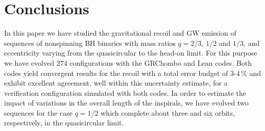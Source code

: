 \section{Conclusions}
\label{bhkick:sec:concl}
%
In this paper we have studied the gravitational recoil and GW emission
of sequences of nonspinning BH binaries with mass ratios $q=2/3$,
$1/2$ and $1/3$,
and eccentricity varying from the quasicircular to the head-on limit.
For this purpose we have evolved $274$ configurations
with the {\sc GRChombo} and {\sc Lean} codes. Both codes yield
convergent results for the recoil with a total error budget of
$3$-$4\,\%$ and exhibit excellent agreement, well within this uncertainty
estimate, for a verification configuration simulated with both codes.
In order to estimate the impact of variations in the overall length
of the inspirals, we have evolved two sequences for the case $q=1/2$ which
complete about three and six orbits, respectively, in the quasicircular limit.

